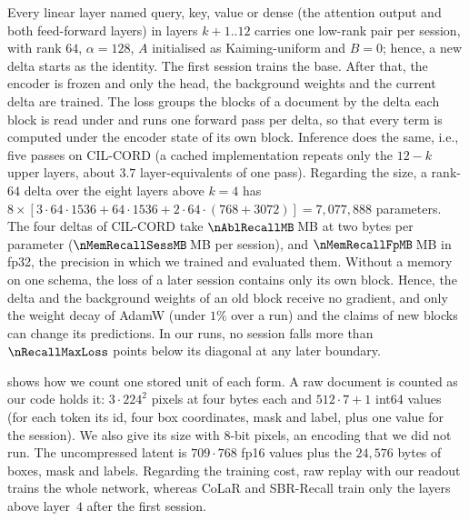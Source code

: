  Every linear layer named query, key, value or dense (the attention output and both feed-forward layers) in layers $k{+}1..12$ carries one low-rank pair per session, with rank $64$, $\alpha{=}128$, $A$ initialised as Kaiming-uniform and $B{=}0$; hence, a new delta starts as the identity. The first session trains the base. After that, the encoder is frozen and only the head, the background weights and the current delta are trained. The loss groups the blocks of a document by the delta each block is read under and runs one forward pass per delta, so that every term is computed under the encoder state of its own block. Inference does the same, i.e., five passes on CIL-CORD (a cached implementation repeats only the $12-k$ upper layers, about $3.7$ layer-equivalents of one pass). Regarding the size, a rank-$64$ delta over the eight layers above $k{=}4$ has $8\times[3\cdot64\cdot1536+64\cdot1536+2\cdot64\cdot(768{+}3072)]=7{,}077{,}888$ parameters. The four deltas of CIL-CORD take $\nAblRecallMB$\,MB at two bytes per parameter ($\nMemRecallSessMB$\,MB per session), and $\nMemRecallFpMB$\,MB in fp32, the precision in which we trained and evaluated them. Without a memory on one schema, the loss of a later session contains only its own block. Hence, the delta and the background weights of an old block receive no gradient, and only the weight decay of AdamW (under $1\%$ over a run) and the claims of new blocks can change its predictions. In our runs, no session falls more than $\nRecallMaxLoss$ points below its diagonal at any later boundary.

\begin{table}[t]
\centering\scriptsize
\setlength{\tabcolsep}{4pt}
\caption{\textbf{Memory accounting} on CIL-CORD ($250$ stored documents, or four deltas; $1$\,MB $=10^6$ bytes). Computed: the size of an encoding that we did not run. Trainable: parameters trained at once after session~1 (SBR-Recall: one delta at a time).}
\label{tab:memory}

\end{table}

  shows how we count one stored unit of each form. A raw document is counted as our code holds it: $3\cdot224^2$ pixels at four bytes each and $512\cdot7{+}1$ int64 values (for each token its id, four box coordinates, mask and label, plus one value for the session). We also give its size with 8-bit pixels, an encoding that we did not run. The uncompressed latent is $709\cdot768$ fp16 values plus the $24{,}576$ bytes of boxes, mask and labels. Regarding the training cost, raw replay with our readout trains the whole network, whereas CoLaR and SBR-Recall train only the layers above layer~$4$ after the first session.

